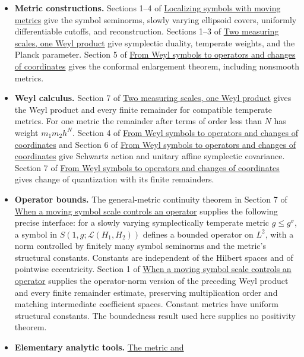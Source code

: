 \documentclass[
  11pt,
]{article}
\providecommand{\tightlist}{%
  \setlength{\itemsep}{0pt}\setlength{\parskip}{0pt}}
\begin{document}
\begin{itemize}
\tightlist
\item
  \textbf{Metric constructions.} Sections 1--4 of
  \href{metric-localization.pdf}{Localizing symbols with moving metrics}
  give the symbol seminorms, slowly varying ellipsoid covers, uniformly
  differentiable cutoffs, and reconstruction. Sections 1--3 of
  \href{weyl-metric-products.pdf}{Two measuring scales, one Weyl product}
  give symplectic duality, temperate weights, and the Planck parameter.
  Section 5 of \href{weyl-covariance-action.pdf}{From Weyl symbols to
  operators and changes of coordinates} gives the conformal enlargement
  theorem, including nonsmooth metrics.
\item
  \textbf{Weyl calculus.} Section 7 of
  \href{weyl-metric-products.pdf}{Two measuring scales, one Weyl product}
  gives the Weyl product and every finite remainder for compatible
  temperate metrics. For one metric the remainder after terms of order
  less than \(N\) has weight \(m_1m_2h^N\). Section 4 of
  \href{weyl-covariance-action.pdf}{From Weyl symbols to operators and
  changes of coordinates} and Section 6 of
  \href{weyl-covariance-action.pdf}{From Weyl symbols to operators and
  changes of coordinates} give Schwartz action and unitary affine
  symplectic covariance. Section 7 of
  \href{weyl-covariance-action.pdf}{From Weyl symbols to operators and
  changes of coordinates} gives change of quantization with its finite
  remainders.
\item
  \textbf{Operator bounds.} The general-metric continuity theorem in
  Section 7 of \href{metric-operator-bounds.pdf}{When a moving symbol
  scale controls an operator} supplies the following precise interface:
  for a slowly varying symplectically temperate metric
  \(g\leq g^\sigma\), a symbol in \(S(1,g;\mathcal L(H_1,H_2))\) defines
  a bounded operator on \(L^2\), with a norm controlled by finitely many
  symbol seminorms and the metric's structural constants. Constants are
  independent of the Hilbert spaces and of pointwise eccentricity.
  Section 1 of \href{metric-operator-bounds.pdf}{When a moving symbol
  scale controls an operator} supplies the operator-norm version of the
  preceding Weyl product and every finite remainder estimate, preserving
  multiplication order and matching intermediate coefficient spaces.
  Constant metrics have uniform structural constants. The boundedness
  result used here supplies no positivity theorem.
\item
  \textbf{Elementary analytic tools.}
  \href{metric-foundation-bridges.pdf}{The metric and
}
\end{itemize}
\end{document}
